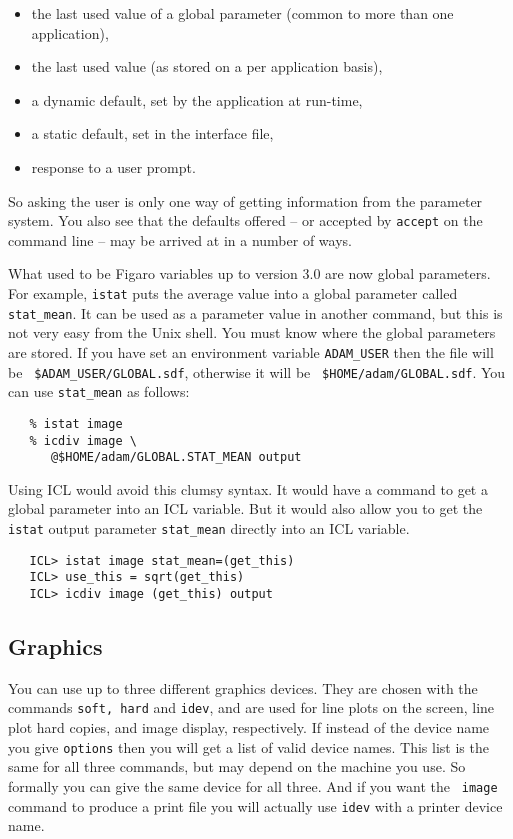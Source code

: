 \begin{itemize}
\item the last used value of a global parameter (common to more than one
   application),
\item the last used value (as stored on a per application basis),
\item a dynamic default, set by the application at run-time,
\item a static default, set in the interface file,
\item response to a user prompt.
\end{itemize}

So asking the user is only one way of getting information from the
parameter system. You also see that the defaults offered -- or accepted
by {\tt accept} on the command line -- may be arrived at in a number of
ways.

What used to be Figaro variables up to version 3.0 are now global
parameters.  For example, {\tt istat} puts the average value into a
global parameter called {\tt stat\_mean}.  It can be used as a parameter
value in another command, but this is not very easy from the Unix shell.
You must know where the global parameters are stored.  If you have set
an environment variable {\tt ADAM\_USER} then the file will be {\tt
\$ADAM\_USER/GLOBAL.sdf}, otherwise it will be {\tt
\$HOME/\-adam/\-GLOBAL.sdf}.  You can use {\tt stat\_mean} as follows:

\begin{verbatim}
   % istat image
   % icdiv image \
      @$HOME/adam/GLOBAL.STAT_MEAN output
\end{verbatim}

Using ICL would avoid this clumsy syntax.  It would have a command to
get a global parameter into an ICL variable.  But it would also allow
you to get the {\tt istat} output parameter {\tt stat\_mean} directly
into an ICL variable.

\begin{verbatim}
   ICL> istat image stat_mean=(get_this)
   ICL> use_this = sqrt(get_this)
   ICL> icdiv image (get_this) output
\end{verbatim}


\subsection{Graphics}

You can use up to three different graphics devices.  They are chosen
with the commands {\tt soft, hard} and {\tt idev}, and are used for line
plots on the screen, line plot hard copies, and image display,
respectively.  If instead of the device name you give {\tt options} then
you will get a list of valid device names.  This list is the same for
all three commands, but may depend on the machine you use.  So formally
you can give the same device for all three.  And if you want the {\tt
image} command to produce a print file you will actually use {\tt idev}
with a printer device name.

